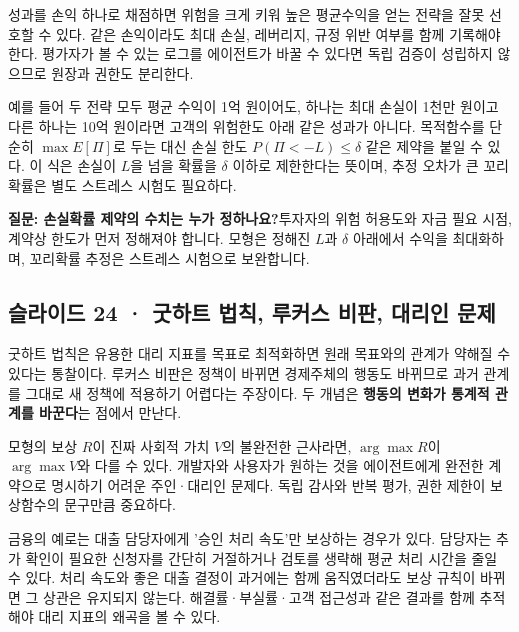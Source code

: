 \documentclass[11pt,a4paper]{article}
\begin{document}
성과를 손익 하나로 채점하면 위험을 크게 키워 높은 평균수익을 얻는 전략을 잘못 선호할 수 있다. 같은 손익이라도 최대 손실, 레버리지, 규정 위반 여부를 함께 기록해야 한다. 평가자가 볼 수 있는 로그를 에이전트가 바꿀 수 있다면 독립 검증이 성립하지 않으므로 원장과 권한도 분리한다.\par

예를 들어 두 전략 모두 평균 수익이 1억 원이어도, 하나는 최대 손실이 1천만 원이고 다른 하나는 10억 원이라면 고객의 위험한도 아래 같은 성과가 아니다. 목적함수를 단순히 $\max E[\Pi]$로 두는 대신 손실 한도 $P(\Pi<-L)\le\delta$ 같은 제약을 붙일 수 있다. 이 식은 손실이 $L$을 넘을 확률을 $\delta$ 이하로 제한한다는 뜻이며, 추정 오차가 큰 꼬리확률은 별도 스트레스 시험도 필요하다.\par

\begin{samepage}\par\medskip\noindent\textbf{질문: 손실확률 제약의 수치는 누가 정하나요?}\quad 투자자의 위험 허용도와 자금 필요 시점, 계약상 한도가 먼저 정해져야 합니다. 모형은 정해진 $L$과 $\delta$ 아래에서 수익을 최대화하며, 꼬리확률 추정은 스트레스 시험으로 보완합니다.\par\end{samepage}

\subsection{슬라이드 24 · 굿하트 법칙, 루커스 비판, 대리인 문제}
굿하트 법칙은 유용한 대리 지표를 목표로 최적화하면 원래 목표와의 관계가 약해질 수 있다는 통찰이다. 루커스 비판은 정책이 바뀌면 경제주체의 행동도 바뀌므로 과거 관계를 그대로 새 정책에 적용하기 어렵다는 주장이다. 두 개념은 \textbf{행동의 변화가 통계적 관계를 바꾼다}는 점에서 만난다.\par

모형의 보상 $R$이 진짜 사회적 가치 $V$의 불완전한 근사라면, $\arg\max R$이 $\arg\max V$와 다를 수 있다. 개발자와 사용자가 원하는 것을 에이전트에게 완전한 계약으로 명시하기 어려운 주인·대리인 문제다. 독립 감사와 반복 평가, 권한 제한이 보상함수의 문구만큼 중요하다.\par

금융의 예로는 대출 담당자에게 '승인 처리 속도'만 보상하는 경우가 있다. 담당자는 추가 확인이 필요한 신청자를 간단히 거절하거나 검토를 생략해 평균 처리 시간을 줄일 수 있다. 처리 속도와 좋은 대출 결정이 과거에는 함께 움직였더라도 보상 규칙이 바뀌면 그 상관은 유지되지 않는다. 해결률·부실률·고객 접근성과 같은 결과를 함께 추적해야 대리 지표의 왜곡을 볼 수 있다.\par
\end{document}
